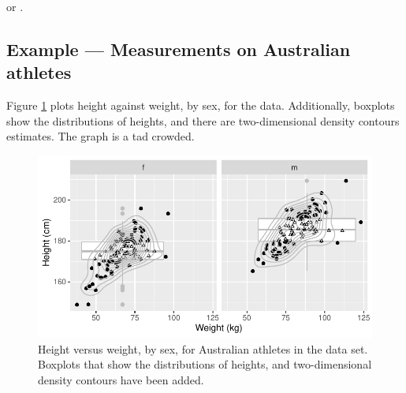 \begin{fullwidth}
\begin{table}
\begin{center}
\begin{minipage}[t]{0.975\textwidth}
{   or
  .}
\setcounter{footnote}{\value{mpfootnote}}
\end{minipage}
\end{center}
\end{table}
\end{fullwidth}
\enlargethispage{9pt}

\subsection*{Example --- Measurements on Australian athletes}

Figure \ref{fig:ggais} plots height against weight, by sex, for the
 data. Additionally, boxplots show the distributions of
heights, and there are two-dimensional density contours estimates.
The graph is a tad crowded.

\begin{figure}
\begin{Schunk}


\centerline{\includegraphics[width=\textwidth]{figs/07-overlay-dens-frills-1} }

\end{Schunk}
\caption{Height versus weight, by sex, for Australian athletes in the
 data set. Boxplots that show the distributions of heights,
and two-dimensional density contours have been
added.\label{fig:ggais}}
\end{figure}

